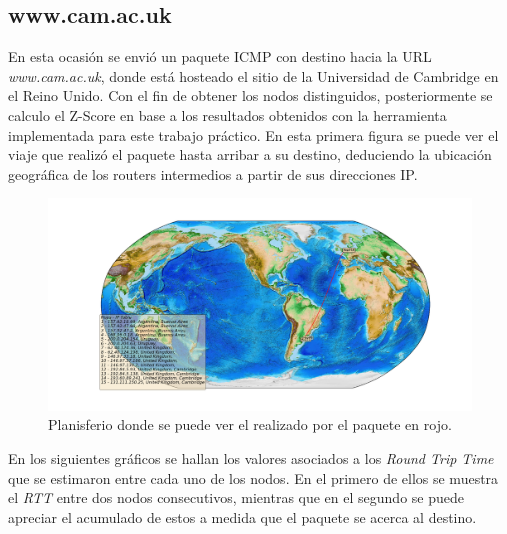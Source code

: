 \subsection{www.cam.ac.uk}

En esta ocasión se envió un paquete ICMP con destino hacia la URL \textit{www.cam.ac.uk}, donde está hosteado el sitio de la Universidad de Cambridge en el Reino Unido. Con el fin de obtener los nodos distinguidos, posteriormente se calculo el Z-Score en base a los resultados obtenidos con la herramienta implementada para este trabajo práctico.
En esta primera figura se puede ver el viaje que realizó el paquete hasta arribar a su destino, deduciendo la ubicación geográfica de los routers intermedios a partir de sus direcciones IP.

\begin{figure}[H]
  \centering	
	\includegraphics[scale=0.3]{../cambridge-experiment/figure_1.png}
  \caption{Planisferio donde se puede ver el realizado por el paquete en rojo.}
	\label{fig:histo-src-sitiotrabajo}
\end{figure}

En los siguientes gráficos se hallan los valores asociados a los \textit{Round Trip Time} que se estimaron entre cada uno de los nodos. En el primero de ellos se muestra el \textit{RTT} entre dos nodos consecutivos, mientras que en el segundo se puede apreciar el acumulado de estos a medida que el paquete se acerca al destino.

